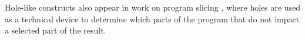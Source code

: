 
Hole-like constructs also appear in work on program slicing
\cite{DBLP:conf/icfp/PereraACL12}, where holes are used as a technical device to determine which parts of the program that do not impact a selected part of the result.




